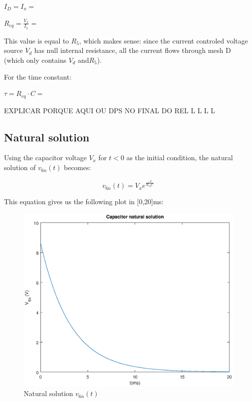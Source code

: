 $I_D = I_x = $
    
$R_{eq} = \frac{V_x}{I_x}= $

This value is equal to $R_5$, which makes sense: since the current controled voltage source $V_d$ has null internal resistance,  all the current flows through mesh D (which only contains $V_d$ and$R_5$).


For the time constant:

$\tau = R_{eq} \cdot C = $


EXPLICAR PORQUE AQUI OU DPS NO FINAL DO REL
L
L
L
L



\subsection{Natural solution}

Using the capacitor voltage $V_x$ for $t<0$ as the initial condition, the natural solution of $v_{6n}(t)$ becomes:

\begin{equation}
\label{eq:solucaonatural}
v_{6n}(t)=V_x e^{\frac{-t}{R_{eq}C}}
\end{equation}

This equation gives us the following plot in [0,20]ms:

  \begin{figure}[H] \centering
    \includegraphics[width=1\linewidth]{natural.eps}
    \caption{Natural solution $v_{6n}(t)$}
    \label{fig:natural}
    \end{figure}



